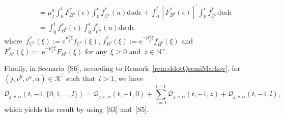 \documentclass{amsart}[11pt]
\numberwithin{equation}{section}
\theoremstyle{definition}
\newcommand{\NN}{\mathbb{N}}
\newcommand{\Kk}{\mathcal{K}}
\newcommand{\D}{\mathrm{d}}
\newcommand{\E}{\mathrm{e}}
\newcommand{\Qq}{\mathcal{Q}}
\begin{document}
\begin{appendix}
\begin{align*}
& = \mu_{{j}}^a\int_0^tF^{*}_{{B}^b}(\epsilon)\int_0^\epsilon f^{*}_{{C}^{\tilde{z}}}(u)\D u\D \epsilon
+ \int_0^t\left[F^*_{B^b}(\epsilon)\right]^\prime\int_0^\epsilon f^*_{C^{\tilde{z}}}\D u \D \epsilon\\
& = \displaystyle \int_0^t f^*_{B^b}(\epsilon)\int_0^\epsilon f^*_{C^{\tilde{z}}}(u)\D u\, \D\epsilon
\end{align*}
where~$f^{*}_{{C}^{z}}(\xi) := \E^{\mu_{{j}}^a \xi}f_{{C}^{z}}(\xi)$,
$f^{*}_{{B}^b}(\xi) := \E^{-\mu_{{j}}^a \xi}f_{{B}^b}(\xi)$
and~$F^{*}_{{B}^b}(\xi) := \E^{-\mu_{{j}}^a \xi}F_{{B}^b}(\xi)$
for any~$\xi\geq 0$ and~$z\in\NN^+$.

Finally, in Scenario~[S6], according to Remark~\ref{rem:ddotQsemiMarkov},
for $\left(j, v^b, v^a, \alpha\right)\in \Kk^\prime$ such that~${l}> 1$, we have
$$
\Qq_{j, v, \alpha}\left(t, -1, \{0, 1, \dots, l\}\right)
 = 
\Qq_{j, v, \alpha}\left(t, -1, 0\right)
+\displaystyle\sum_{z = 1}^{{l}-1}
\Qq_{j, v, \alpha}\left(t, -1, z\right)
+ \Qq_{j, v, \alpha}\left(t, -1, l\right),
$$
which yields the result by using~[S3] and~[S5]. 




\end{appendix}
\end{document}
